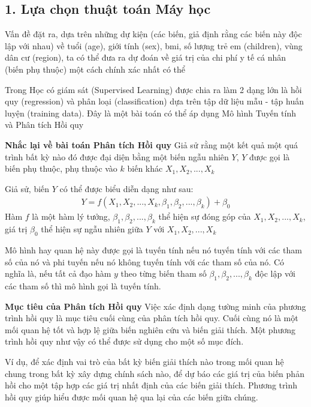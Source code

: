 \documentclass{article}
\begin{document}
	\subsection{1. Lựa chọn thuật toán Máy học}
	\qquad Vấn đề đặt ra, dựa trên những dự kiện (các biến, giả định rằng các biến này độc lập với nhau) về tuổi (age), giới tính (sex), bmi, số lượng trẻ em (children), vùng dân cư (region), ta có thể đưa ra dự đoán về giá trị của chi phí y tế cá nhân (biến phụ thuộc) một cách chính xác nhất có thể
	
	Trong Học có giám sát (Supervised Learning) được chia ra làm 2 dạng lớn là hồi quy (regression) và phân loại (classification) dựa trên tập dữ liệu mẫu - tập huấn luyện (training data). Đây là một bài toán có thể áp dụng Mô hình Tuyến tính và Phân tích Hồi quy
	
	\textbf{Nhắc lại về bài toán Phân tích Hồi quy}
	Giả sử rằng một kết quả một quá trình bất kỳ nào đó được đại diện bằng một biến ngẫu nhiên $Y$, $Y$ được gọi là biến phụ thuộc, phụ thuộc vào $k$ biến khác $X_1, X_2, ..., X_k$

	Giả sử, biến $Y$ có thể được biểu diễn dạng như sau:
	\begin{align*}
		Y = f(X_1, X_2, ..., X_k, \beta_1, \beta_2, ..., \beta_k) + \beta_0
	\end{align*}
	Hàm $f$ là một hàm lý tưởng, $\beta_1, \beta_2, ..., \beta_k$ thể hiện sự đóng góp của $X_1, X_2, ..., X_k$, giá trị $\beta_0$ thể hiện sự ngẫu nhiên giữa $Y$ với $X_1, X_2, ..., X_k$
	
	Mô hình hay quan hệ này được gọi là tuyến tính nếu nó tuyến tính với các tham số của nó và phi tuyến nếu nó không tuyến tính với các tham số của nó. Có nghĩa là, nếu tất cả đạo hàm $y$ theo từng biến tham số $\beta_1, \beta_2, ..., \beta_k$ độc lập với các tham số thì mô hình gọi là tuyến tính.
	
	\textbf{Mục tiêu của Phân tích Hồi quy} Việc xác định dạng tường minh của phương trình hồi quy là mục tiêu cuối cùng của phân tích hồi quy. Cuối cùng nó là một mối quan hệ tốt và hợp lệ giữa biến nghiên cứu và biến giải thích. Một phương trình hồi quy như vậy có thể được sử dụng cho một số mục đích. 
	
	Ví dụ, để xác định vai trò của bất kỳ biến giải thích nào trong mối quan hệ chung trong bất kỳ xây dựng chính sách nào, để dự báo các giá trị của biến phản hồi cho một tập hợp các giá trị nhất định của các biến giải thích. Phương trình hồi quy giúp hiểu được mối quan hệ qua lại của các biến giữa chúng.
	
\end{document}
